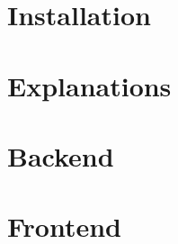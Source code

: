 
	\frame{
		\titlepage
	}
	
	
	\section{Installation}
	
	
	\section{Explanations}
	
	
	\section{Backend}
	

	\section{Frontend}
	

